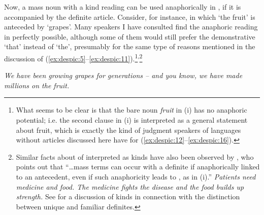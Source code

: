 \documentclass[output=paper,
modfonts
]{langscibook}
\begin{document}
	Now, a mass noun with a kind reading can be used anaphorically in , if it is accompanied
	by the definite article. Consider, for instance,  in which `the fruit' is anteceded by `grapes'.
	Many speakers I have consulted find the anaphoric reading in  perfectly possible, although
	some of them would still prefer the demonstrative `that' instead of `the', presumably for the
	same type of reasons mentioned in the discussion of (\ref{ex:despic:5}--\ref{ex:despic:11}).\footnote{What seems to be clear is that the bare noun \textit{fruit} in (i) has no anaphoric potential; i.e. the second clause in (i) is interpreted as a general statement about fruit, which is exactly the kind of judgment speakers of languages without
		articles discussed here have for (\ref{ex:despic:12}--\ref{ex:despic:16}).
		\z\vspace*{-\baselineskip}}\textsuperscript{,}\footnote{Similar facts about  of  interpreted as kinds have also been observed by \citet[ft. 43, 435--436]{Dayal2004}, who points out that ``\ldots mass terms can occur with a definite if anaphorically linked to an antecedent, even if such anaphoricity leads to , as in (i).''
		\ea \textit{Patients need medicine and food. {\op}The{\cp} medicine fights the disease and {\op}the{\cp} food builds up strength.}
		\label{ex:despic:n7}
		\z
		See  for a discussion of kinds in connection with the distinction between unique and familiar definites.}\largerpage[-2]
	
	
	\ea \label{ex:despic:17}
	\textit{We have been growing grapes for generations -- and you know, we have made millions on
		the fruit.}
	\z
	
\end{document}
